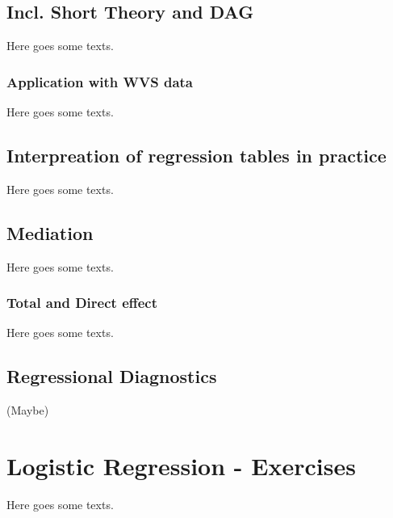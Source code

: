 \documentclass[
]{book}
\begin{document}
\hypertarget{incl.-short-theory-and-dag-1}{%
\section{Incl. Short Theory and DAG}\label{incl.-short-theory-and-dag-1}}

Here goes some texts.

\hypertarget{application-with-wvs-data-1}{%
\subsection{Application with WVS data}\label{application-with-wvs-data-1}}

Here goes some texts.

\hypertarget{interpreation-of-regression-tables-in-practice-1}{%
\section{Interpreation of regression tables in practice}\label{interpreation-of-regression-tables-in-practice-1}}

Here goes some texts.

\hypertarget{mediation-3}{%
\section{Mediation}\label{mediation-3}}

Here goes some texts.

\hypertarget{total-and-direct-effect-1}{%
\subsection{Total and Direct effect}\label{total-and-direct-effect-1}}

Here goes some texts.

\hypertarget{regressional-diagnostics-1}{%
\section{Regressional Diagnostics}\label{regressional-diagnostics-1}}

(Maybe)

\hypertarget{log-e}{%
\chapter{Logistic Regression - Exercises}\label{log-e}}

Here goes some texts.
\end{document}
